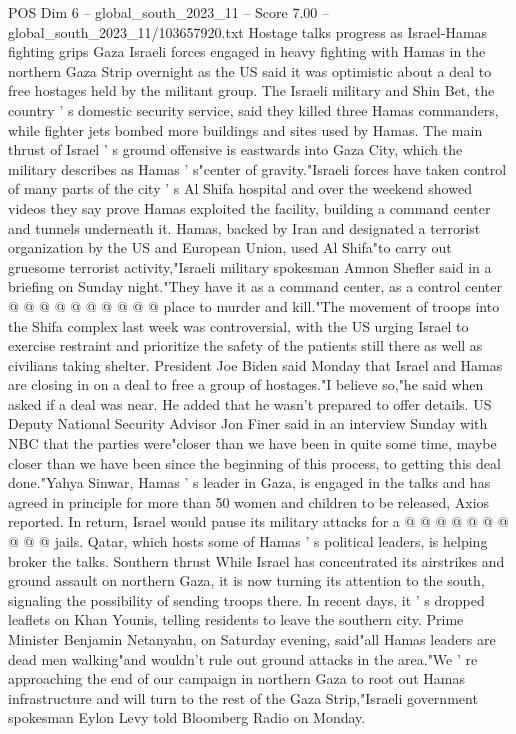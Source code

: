 \begin{textsample}{POS Dim 6 – global\_south\_2023\_11 – Score 7.00 – global\_south\_2023\_11/103657920.txt}  \label{ex:f6_pos_252}
Hostage talks progress as Israel-Hamas fighting grips Gaza Israeli forces engaged in heavy fighting with Hamas in the northern Gaza Strip overnight as the US said it was optimistic about a deal to free hostages held by the militant group.
The Israeli military and Shin Bet, the country ' s domestic security service, said they killed three Hamas commanders, while fighter jets bombed more buildings and sites used by Hamas.
The main thrust of Israel ' s ground offensive is eastwards into Gaza City, which the military describes as Hamas ' s"center of gravity."Israeli forces have taken control of many parts of the city ' s Al Shifa hospital and over the weekend showed videos they say prove Hamas exploited the facility, building a command center and tunnels underneath it.
Hamas, backed by Iran and designated a terrorist organization by the US and European Union, used Al Shifa"to carry out gruesome terrorist activity,"Israeli military spokesman Amnon Shefler said in a briefing on Sunday night."They have it as a command center, as a control center @ @ @ @ @ @ @ @ @ @ place to murder and kill."The movement of troops into the Shifa complex last week was controversial, with the US urging Israel to exercise restraint and prioritize the safety of the patients still there as well as civilians taking shelter.
President Joe Biden said Monday that Israel and Hamas are closing in on a deal to free a group of hostages."I believe so,"he said when asked if a deal was near.
He added that he wasn't prepared to offer details.
US Deputy National Security Advisor Jon Finer said in an interview Sunday with NBC that the parties were"closer than we have been in quite some time, maybe closer than we have been since the beginning of this process, to getting this deal done."Yahya Sinwar, Hamas ' s leader in Gaza, is engaged in the talks and has agreed in principle for more than 50 women and children to be released, Axios reported.
In return, Israel would pause its military attacks for a @ @ @ @ @ @ @ @ @ @ jails.
Qatar, which hosts some of Hamas ' s political leaders, is helping broker the talks.
Southern thrust While Israel has concentrated its airstrikes and ground assault on northern Gaza, it is now turning its attention to the south, signaling the possibility of sending troops there.
In recent days, it ' s dropped leaflets on Khan Younis, telling residents to leave the southern city.
Prime Minister Benjamin Netanyahu, on Saturday evening, said"all Hamas leaders are dead men walking"and wouldn't rule out ground attacks in the area."We ' re approaching the end of our campaign in northern Gaza to root out Hamas infrastructure and will turn to the rest of the Gaza Strip,"Israeli government spokesman Eylon Levy told Bloomberg Radio on Monday.

\end{textsample}
